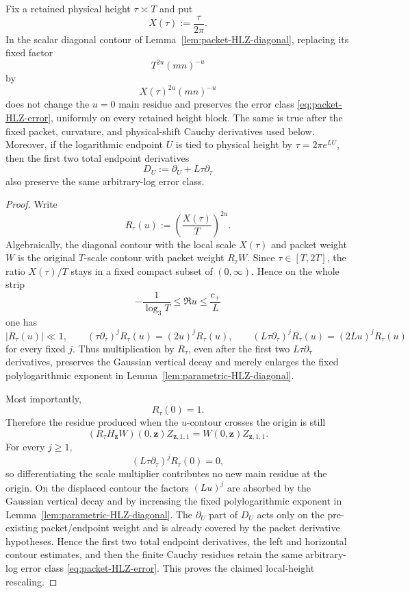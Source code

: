 \begin{lemma}
\label{lem:HLZ-local-height-rescaling}
Fix a retained physical height $\tau\asymp T$ and put
\[
X(\tau):=\frac{\tau}{2\pi}.
\]
In the scalar diagonal contour of Lemma~\ref{lem:packet-HLZ-diagonal}, replacing
its fixed factor
\[
T^{2u}(mn)^{-u}
\]
by
\[
X(\tau)^{2u}(mn)^{-u}
\]
does not change the $u=0$ main residue and preserves the error class
\eqref{eq:packet-HLZ-error}, uniformly on every retained height block.  The same
is true after the fixed packet, curvature, and physical-shift Cauchy
derivatives used below.  Moreover, if the logarithmic endpoint $U$ is tied to
physical height by $\tau=2\pi e^{LU}$, then the first two total endpoint
derivatives
\[
D_U:=\partial_U+L\tau\partial_\tau
\]
also preserve the same arbitrary-log error class.
\end{lemma}

\begin{proof}
Write
\[
R_\tau(u):=\left(\frac{X(\tau)}{T}\right)^{2u}.
\]
Algebraically, the diagonal contour with the local scale $X(\tau)$ and packet
weight $W$ is the original $T$-scale contour with packet weight $R_\tau W$.
Since $\tau\in[T,2T]$, the ratio $X(\tau)/T$ stays in a fixed compact subset of
$(0,\infty)$.  Hence on the whole strip
\[
-\frac1{\log_3T}\le \Re u\le\frac{c_+}{L}
\]
one has
\[
|R_\tau(u)|\ll1,
\qquad
(\tau\partial_\tau)^jR_\tau(u)=(2u)^jR_\tau(u),
\qquad
(L\tau\partial_\tau)^jR_\tau(u)=(2Lu)^jR_\tau(u)
\]
for every fixed $j$.  Thus multiplication by $R_\tau$, even after the first
two $L\tau\partial_\tau$ derivatives, preserves the Gaussian vertical decay
and merely enlarges the fixed polylogarithmic exponent in
Lemma~\ref{lem:parametric-HLZ-diagonal}.

Most importantly,
\[
R_\tau(0)=1.
\]
Therefore the residue produced when the $u$-contour crosses the origin is still
\[
(R_\tau H_{\mathbf z}W)(0,\mathbf z)Z_{\mathbf z,1,1}
=W(0,\mathbf z)Z_{\mathbf z,1,1}.
\]
For every $j\ge1$,
\[
(L\tau\partial_\tau)^jR_\tau(0)=0,
\]
so differentiating the scale multiplier contributes no new main residue at the
origin.  On the displaced contour the factors $(Lu)^j$ are absorbed by the
Gaussian vertical decay and by increasing the fixed polylogarithmic exponent
in Lemma~\ref{lem:parametric-HLZ-diagonal}.  The $\partial_U$ part of $D_U$ acts
only on the pre-existing packet/endpoint weight and is already covered by the
packet derivative hypotheses.  Hence the first two total endpoint derivatives,
the left and horizontal contour estimates, and then the finite Cauchy residues
retain the same arbitrary-log error class \eqref{eq:packet-HLZ-error}.  This
proves the claimed local-height rescaling.
\end{proof}

